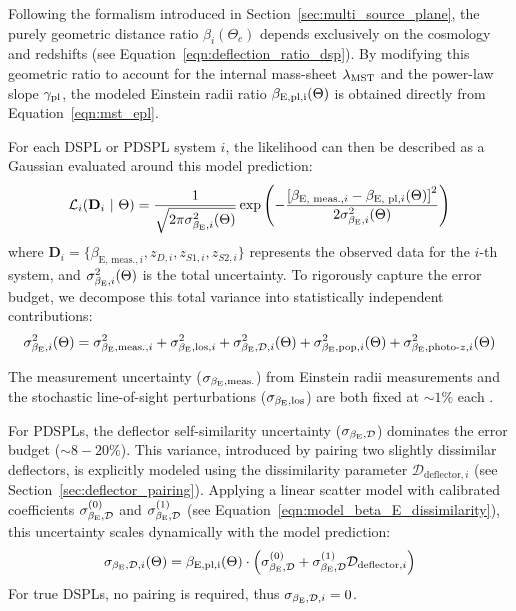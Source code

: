 \documentclass[a4paper,11pt]{article}
\begin{document}
Following the formalism introduced in Section~\ref{sec:multi_source_plane}, the purely geometric distance ratio $\beta_i(\Theta_c)$ depends exclusively on the cosmology and redshifts (see Equation~\ref{eqn:deflection_ratio_dsp}). By modifying this geometric ratio to account for the internal mass-sheet $\lambda_{\rm MST}$ and the power-law slope $\gamma_{\rm pl}$, the modeled Einstein radii ratio $\beta_{\rm E, pl, i}(\Theta)$ is obtained directly from Equation~\ref{eqn:mst_epl}. 

For each DSPL or PDSPL system $i$, the likelihood can then be described as a Gaussian evaluated around this model prediction:
\begin{equation}
    \mathcal{L}_i(\mathbf{D}_i \ | \ \Theta) = \frac{1}{\sqrt{2\pi\sigma_{\beta_{\rm E}, i}^2(\Theta)}} \exp\left(-\frac{\left[ {\beta}_{\text{E, meas.}, i} - {\beta}_{\text{E, pl}, i}(\Theta) \right]^2}{2\sigma_{\beta_{\rm E}, i}^2(\Theta)}\right)
\end{equation}
where $\mathbf{D}_i = \{\beta_{\text{E, meas.}, i}, z_{D,i}, z_{S1,i}, z_{S2,i}\}$ represents the observed data for the $i$-th system, and $\sigma_{\beta_{\rm E}, i}^2(\Theta)$ is the total uncertainty. To rigorously capture the error budget, we decompose this total variance into statistically independent contributions:
\begin{equation}
    \sigma_{\beta_{\rm E}, i}^2(\Theta) = \sigma_{\beta_{\rm E},\text{meas.}, i}^2 + \sigma_{\beta_{\rm E},\text{los}, i}^2 + \sigma_{\beta_{\rm E},\mathcal{D}, i}^2(\Theta) + \sigma_{\beta_{\rm E},\text{pop}, i}^2(\Theta) + \sigma_{\beta_{\rm E},\text{photo-}z, i}^2(\Theta)
\end{equation}

The measurement uncertainty ($\sigma_{\beta_{\rm E},\text{meas.}}$) from Einstein radii measurements and the stochastic line-of-sight perturbations ($\sigma_{\beta_{\rm E},\text{los}}$) are both fixed at $\sim 1\%$ each \citep{Collett:2014, Johnson:2025, Smith:2021}. 

For PDSPLs, the deflector self-similarity uncertainty ($\sigma_{\beta_{\rm E},\mathcal{D}}$) dominates the error budget ($\sim 8-20\%$). This variance, introduced by pairing two slightly dissimilar deflectors, is explicitly modeled using the dissimilarity parameter $\mathcal{D}_{\text{deflector},i}$ (see Section~\ref{sec:deflector_pairing}). Applying a linear scatter model with calibrated coefficients $\sigma_{\beta_{\rm E},\rm \mathcal{D}}^{(0)}$ and $\sigma_{\beta_{\rm E},\rm \mathcal{D}}^{(1)}$ (see Equation~\ref{eqn:model_beta_E_dissimilarity}), this uncertainty scales dynamically with the model prediction:
\begin{equation}
    \sigma_{\beta_{\rm E},\mathcal{D}, i}(\Theta) = \beta_{\rm E, pl, i}(\Theta) \cdot \left(\sigma_{\beta_{\rm E},\rm \mathcal{D}}^{(0)} + \sigma_{\beta_{\rm E},\rm \mathcal{D}}^{(1)} \mathcal{D}_{\text{deflector}, i}\right)
\end{equation}
For true DSPLs, no pairing is required, thus $\sigma_{\beta_{\rm E},\mathcal{D}, i} = 0$.
\end{document}
